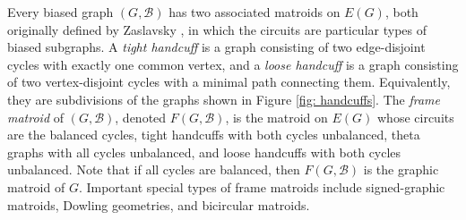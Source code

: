 \documentclass[12pt]{article}
\theoremstyle{definition}
\theoremstyle{plain} %
\newcommand{\cB}{\mathcal{B}}
\begin{document}
Every biased graph $(G, \cB)$ has two associated matroids on $E(G)$, both originally defined by Zaslavsky \cite{Zaslavsky1991}, in which the circuits are particular types of biased subgraphs.
A \emph{tight handcuff} is a graph consisting of two edge-disjoint cycles with exactly one common vertex, and a \emph{loose handcuff} is a graph consisting of two vertex-disjoint cycles with a minimal path connecting them.
Equivalently, they are subdivisions of the graphs shown in Figure \ref{fig: handcuffs}.
The \emph{frame matroid} of $(G, \cB)$, denoted $F(G, \cB)$, is the matroid on $E(G)$ whose circuits are the balanced cycles, tight handcuffs with both cycles unbalanced, theta graphs with all cycles unbalanced, and loose handcuffs with both cycles unbalanced.
Note that if all cycles are balanced, then $F(G, \cB)$ is the graphic matroid of $G$.
Important special types of frame matroids include signed-graphic matroids, Dowling geometries, and bicircular matroids.
\end{document}
